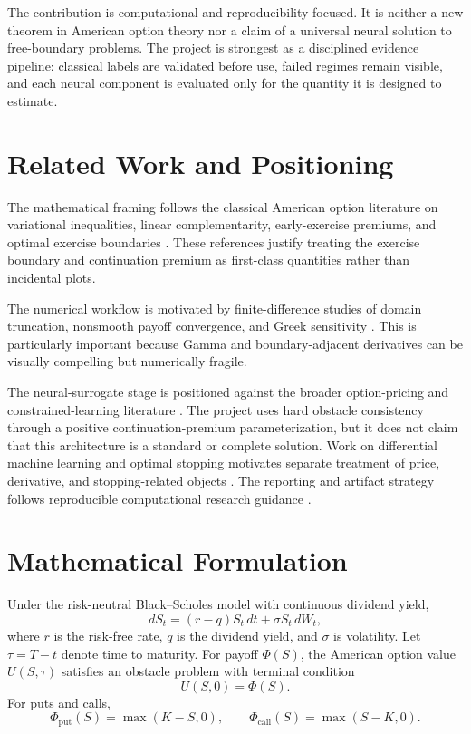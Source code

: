 \documentclass[11pt]{article}
\begin{document}
The contribution is computational and reproducibility-focused. It is neither a
new theorem in American option theory nor a claim of a universal neural solution
to free-boundary problems. The project is strongest as a disciplined evidence
pipeline: classical labels are validated before use, failed regimes remain
visible, and each neural component is evaluated only for the quantity it is
designed to estimate.

\section{Related Work and Positioning}
The mathematical framing follows the classical American option literature on variational inequalities, linear complementarity, early-exercise premiums, and optimal exercise boundaries \cite{JailletLambertonLapeyre1990,HuangPang1998,Kim1990,CarrJarrowMyneni1992,Peskir2005,ChenChadam2007,EvansKuskeKeller2002}. These references justify treating the exercise boundary and continuation premium as first-class quantities rather than incidental plots.

The numerical workflow is motivated by finite-difference studies of domain truncation, nonsmooth payoff convergence, and Greek sensitivity \cite{KangroNicolaides2000,PooleyVetzalForsyth2003,GilesCarter2006,InTHout2024}. This is particularly important because Gamma and boundary-adjacent derivatives can be visually compelling but numerically fragile.

The neural-surrogate stage is positioned against the broader option-pricing and constrained-learning literature \cite{HutchinsonLoPoggio1994,RufWang2020,LiuOosterleeBohte2019,DugasEtAl2009,YangZhengHospedales2017,CaoLiuZhai2021}. The project uses hard obstacle consistency through a positive continuation-premium parameterization, but it does not claim that this architecture is a standard or complete solution. Work on differential machine learning and optimal stopping motivates separate treatment of price, derivative, and stopping-related objects \cite{BeckerCheriditoJentzen2019,HugeSavine2020,FrandsenPedersenPoulsen2022}. The reporting and artifact strategy follows reproducible computational research guidance \cite{SandveEtAl2013,WilsonEtAl2014}.

\section{Mathematical Formulation}
Under the risk-neutral Black--Scholes model with continuous dividend yield,
\begin{equation}
  dS_t = (r-q)S_t\,dt + \sigma S_t\,dW_t,
\end{equation}
where $r$ is the risk-free rate, $q$ is the dividend yield, and $\sigma$ is volatility. Let $\tau=T-t$ denote time to maturity. For payoff $\Phi(S)$, the American option value $U(S,\tau)$ satisfies an obstacle problem with terminal condition
\begin{equation}
  U(S,0)=\Phi(S).
\end{equation}
For puts and calls,
\begin{equation}
  \Phi_{\mathrm{put}}(S)=\max(K-S,0), \qquad
  \Phi_{\mathrm{call}}(S)=\max(S-K,0).
\end{equation}
\end{document}
